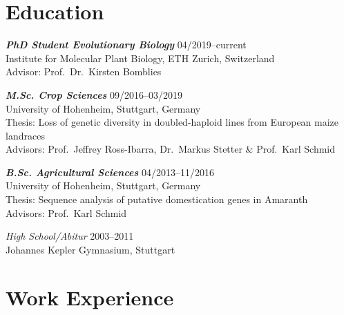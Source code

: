 \documentclass[margin,10pt,a4paper]{res}
\begin{document}
\begin{resume}

\section{Education}

\textbf{\textit{PhD Student Evolutionary Biology}} \hfill 04/2019--current \\
Institute for Molecular Plant Biology, ETH Zurich, Switzerland \\
Advisor: Prof.~Dr.~Kirsten Bomblies

\textbf{\textit{M.Sc. Crop Sciences}} \hfill 09/2016--03/2019 \\
University of Hohenheim, Stuttgart, Germany \\
Thesis: Loss of genetic diversity in doubled-haploid lines from European maize landraces \\
Advisors: Prof.~Jeffrey Ross-Ibarra, Dr.~Markus Stetter \& Prof.~Karl Schmid


\textbf{\textit{B.Sc. Agricultural Sciences}} \hfill 04/2013--11/2016 \\
University of Hohenheim, Stuttgart, Germany\\
Thesis: Sequence analysis of putative domestication genes in Amaranth\\
Advisors: Prof.~Karl Schmid

{\sl High School/Abitur} \hfill 2003--2011 \\
Johannes Kepler Gymnasium, Stuttgart

 
\section{Work Experience}


\end{resume}
\end{document}
